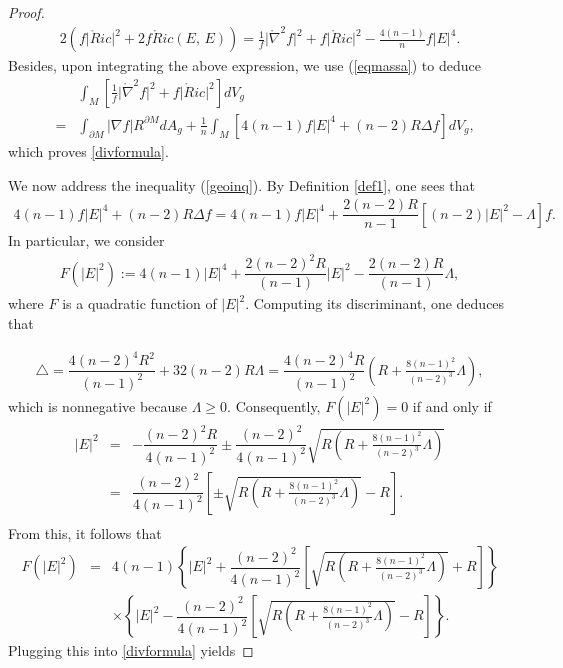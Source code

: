 \documentclass{amsart}
\numberwithin{equation}{section}
\begin{document}
\begin{proof}
 
		\begin{eqnarray*}
			2(f\vert\mathring{R}ic\vert^{2}	+ 2f\mathring{R}ic(E,\,E)) = \frac{1}{f}\vert\mathring{\nabla}^2f\vert^{2} + f\vert\mathring{R}ic\vert^{2} - \frac{4(n-1)}{n}f\vert E\vert^{4}.
		\end{eqnarray*} Besides, upon integrating the above expression, we use (\ref{eqmassa}) to deduce
		\begin{eqnarray*}
			&&	\int_{M}\left[\frac{1}{f}\vert\mathring{\nabla}^2f\vert^{2} + f\vert\mathring{R}ic\vert^{2}\right]dV_{g}\nonumber\\
			&=&
			\int_{\partial M}\vert\nabla f\vert R^{\partial M} dA_{g} + \frac{1}{n}\int_{M}\left[4(n-1)f\vert E\vert^{4}+(n-2)R\Delta f\right]dV_{g},
		\end{eqnarray*} which proves \eqref{divformula}.
		
		
		
		
		
		
		
		We now address the inequality (\ref{geoinq}). By Definition \ref{def1}, one sees that
		\begin{eqnarray*}
			4(n-1)f\vert E\vert^{4}+(n-2)R\Delta f = 4(n-1)f\vert E\vert^{4}+   \dfrac{2(n-2)R}{n - 1}\left[(n - 2)|E|^2 - 
			\Lambda\right]f.
		\end{eqnarray*} In particular, we consider
		\begin{eqnarray*}
			F(\vert E\vert^{2}) := 4(n-1)\vert E\vert^{4}+   \dfrac{2(n-2)^2R}{(n - 1)}|E|^2 - 
			\dfrac{2(n-2)R}{(n - 1)}\Lambda,
		\end{eqnarray*} where $F$ is a quadratic function of $\vert E\vert^{2}$. Computing its discriminant, one deduces that 
		

		\begin{eqnarray*}
			\triangle = \dfrac{4(n-2)^4R^2}{(n - 1)^2} + 	32(n-2)R\Lambda  =\dfrac{4(n-2)^4R}{(n - 1)^2}\left(R + \frac{8(n-1)^2}{(n-2)^3}\Lambda\right),
		\end{eqnarray*}which is nonnegative because $\Lambda\geq 0.$ Consequently, $F(\vert E\vert^{2}) =0 $ if and only if
		\begin{eqnarray*}
			\vert E\vert^{2} &=& -\dfrac{(n-2)^2R}{4(n - 1)^2} \pm \dfrac{(n-2)^2}{4(n - 1)^2}\sqrt{R\left(R + \frac{8(n-1)^2}{(n-2)^3}\Lambda\right)}\nonumber\\
			&=&\dfrac{(n-2)^2}{4(n - 1)^2}\left[\pm\sqrt{R\left(R + \frac{8(n-1)^2}{(n-2)^3}\Lambda\right)} - R\right]. \nonumber\\
		\end{eqnarray*} From this, it follows that 
		\begin{eqnarray*}
			F(\vert E\vert^{2}) &=& 4(n-1)\left\{\vert E\vert^{2} +  \dfrac{(n-2)^2}{4(n - 1)^2}\left[\sqrt{R\left(R + \frac{8(n-1)^2}{(n-2)^3}\Lambda\right)} +R\right]\right\}\nonumber\\
			&&\times\left\{\vert E\vert^{2} -  \dfrac{(n-2)^2}{4(n - 1)^2}\left[\sqrt{R\left(R + \frac{8(n-1)^2}{(n-2)^3}\Lambda\right)} - R\right]\right\}.
		\end{eqnarray*} Plugging this into \eqref{divformula} yields
	

\end{proof}
\end{document}
